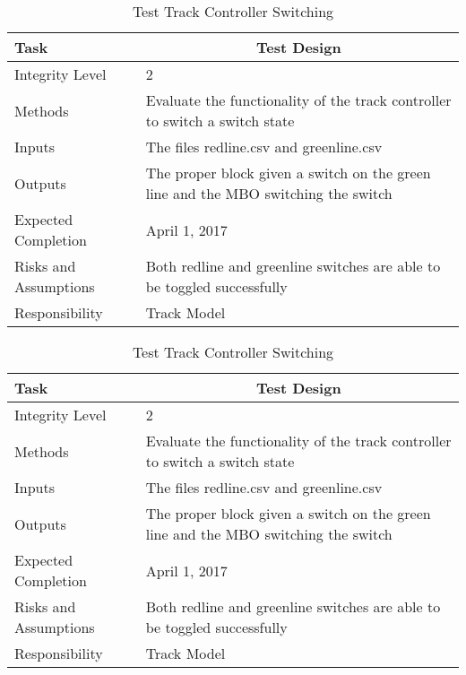 \documentclass[]{article}
\begin{document}
\begin{table}[H]
	\centering
	\caption{Test Track Controller Switching}
	\begin{tabular}{|l|l|}
		\hline
		Task & \multicolumn{1}{c|}{Test Design} \\ \hline
		Integrity Level & 2 \\ \hline
		Methods & Evaluate the functionality of the track controller to switch a switch state \\ \hline
		Inputs &  The files redline.csv and greenline.csv \\ \hline
		Outputs &  \parbox[t]{10cm}{The proper block given a switch on the green line and the MBO switching the switch}\\ \hline
		Expected Completion & April 1, 2017\\ \hline
		Risks and Assumptions & Both redline and greenline switches are able to be toggled successfully \\ \hline
		Responsibility & Track Model\\ \hline
	\end{tabular}
\end{table}

\begin{table}[H]
	\centering
	\caption{Test Track Controller Switching}
	\begin{tabular}{|l|l|}
		\hline
		Task & \multicolumn{1}{c|}{Test Design} \\ \hline
		Integrity Level & 2 \\ \hline
		Methods & Evaluate the functionality of the track controller to switch a switch state \\ \hline
		Inputs &  The files redline.csv and greenline.csv \\ \hline
		Outputs &  \parbox[t]{10cm}{The proper block given a switch on the green line and the MBO switching the switch}\\ \hline
		Expected Completion & April 1, 2017\\ \hline
		Risks and Assumptions & Both redline and greenline switches are able to be toggled successfully \\ \hline
		Responsibility & Track Model\\ \hline
	\end{tabular}
\end{table}
\end{document}

